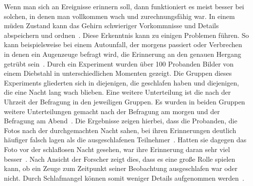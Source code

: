 Wenn man sich an Ereignisse erinnern soll, dann funktioniert es meist besser bei solchen, in denen man vollkommen wach und zurechnungsfähig war. In einem müden Zustand kann das Gehirn schwieriger Vorkommnisse und Details abspeichern und ordnen~\cite{online:streiche}. 
Diese Erkenntnis kann zu einigen Problemen führen. So kann beispielsweise bei einem Autounfall, der morgens passiert oder Verbrechen in denen ein Augenzeuge befragt wird, die Erinnerung an den genauen Hergang getrübt sein~\cite{online:streiche}. 
Durch ein Experiment wurden über 100 Probanden Bilder von einem Diebstahl in unterschiedlichen Momenten gezeigt. 
Die Gruppen dieses Experiments gliederten sich in diejenigen, die geschlafen haben und diejenigen, die eine Nacht lang wach blieben. Eine weitere Unterteilung ist die nach der Uhrzeit der Befragung in den jeweiligen Gruppen. Es wurden in beiden Gruppen weitere Unterteilungen gemacht nach der Befragung am morgen und der Befragung am Abend~\cite{online:streiche}. 
Die Ergebnisse zeigen hierbei, dass die Probanden, die Fotos nach der durchgemachten Nacht sahen, bei ihren Erinnerungen deutlich häufiger falsch lagen als die ausgeschlafenen Teilnehmer~\cite{online:streiche}.
Hatten sie dagegen das Foto vor der schlaflosen Nacht gesehen, war ihre Erinnerung daran sehr viel besser~\cite{online:streiche}. 
Nach Ansicht der Forscher zeigt dies, dass es eine große Rolle spielen kann, ob ein Zeuge zum Zeitpunkt seiner Beobachtung ausgeschlafen war oder nicht. Durch Schlafmangel können somit weniger Details aufgenommen werden~\cite{online:streiche}.
